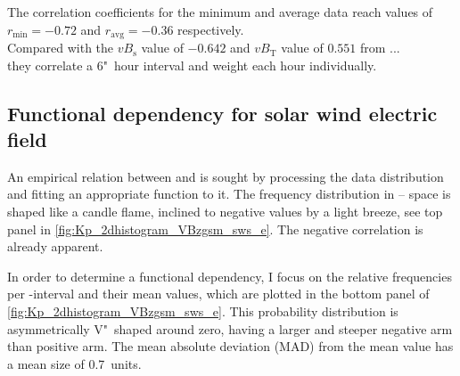 The correlation coefficients for the minimum and average data reach values of $r_\text{min} = -0.72$ and $r_\text{avg} = -0.36$ respectively.\\

Compared with the $vB_\text{s}$ value of $-0.642$ and $vB_\text{T}$ value of $0.551$ from \citet{Newell2007}...\\
they correlate a 6"~hour interval and weight each hour individually.\\


\subsection{Functional dependency for solar wind electric field}
An empirical relation between \vBz{} and \Kp{} is sought by processing the data distribution and fitting an appropriate function to it.
The frequency distribution in \Kp--\vBz{} space is shaped like a candle flame, inclined to negative values by a light breeze, see top panel in \autoref{fig:Kp_2dhistogram_VBzgsm_sws_e}. The negative correlation is already apparent.
\begin{figure}
\end{figure}
In order to determine a functional dependency, I focus on the relative frequencies per \vBz-interval and their mean \Kp{} values, which are plotted in the bottom panel of \autoref{fig:Kp_2dhistogram_VBzgsm_sws_e}. This probability distribution is asymmetrically V"~shaped around zero, having a larger and steeper negative arm than positive arm. The mean absolute deviation (MAD) from the mean \Kp{} value has a mean size of \SI{0.7}{\Kp}~units.

